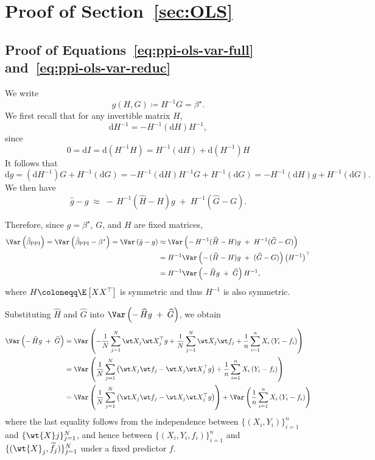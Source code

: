 \section{Proof of Section~\ref{sec:OLS}}
\subsection{Proof of Equations~\eqref{eq:ppi-ols-var-full} and~\eqref{eq:ppi-ols-var-reduc}}
\label{subsec:proof-ols-var}
We write \[g(H,G) \coloneqq H^{-1}G= \beta^\star.\]
We first recall that for any invertible matrix $H$,\[
\mathrm{d}H^{-1}=-H^{-1}(\mathrm{d}H)H^{-1},
\]since\[
0=\mathrm{d}I=\mathrm{d}\left(H^{-1}H\right)=H^{-1}\left(\mathrm{d}H\right)+\mathrm{d}\left(H^{-1}\right)H
\]
It follows that \[\mathrm{d}g=\left(\mathrm{d}H^{-1}\right)G+H^{-1}\left(\mathrm{d}G\right)=-H^{-1}(\mathrm{d}H)H^{-1}G+H^{-1}\left(\mathrm{d}G\right)=-H^{-1}(\mathrm{d}H)g+H^{-1}\left(\mathrm{d}G\right).\]
We then have \[
\widehat{g} - g
\;\approx\;
-\,H^{-1}(\widehat{H} - H)g
\;+\;
H^{-1}(\widehat{G} - G).
\]

\noindent Therefore, since $g=\beta^\star$, $G$, and $H$ are fixed matrices, \begin{align*}
    \Var\left(\hat{\beta}_{\mathrm{PPI}}\right)
    =\Var\left(\hat{\beta}_{\mathrm{PPI}}-\beta^\star\right)
    =\Var\left(\hat{g}-g\right)
    &\approx\Var\left(-\,H^{-1}(\widehat{H} - H)g\;+\;H^{-1}(\widehat{G} - G)\right)\\
    &=H^{-1}\Var\left(-\,(\widehat{H} - H)g\;+\;(\widehat{G} - G)\right)\left(H^{-1}\right)^\top\\
    &=H^{-1}\Var\left(-\,\widehat{H}g\;+\;\widehat{G}\right)H^{-1},
\end{align*}where $H\coloneqq \E\left[XX^\top\right]$ is symmetric and thus $H^{-1}$ is also symmetric.

Substituting $\hat{H}$ and $\hat{G}$ into $\Var\left(-\,\widehat{H}g\;+\;\widehat{G}\right)$, we obtain 
\begin{align*}
    \Var\left(-\,\widehat{H}g\;+\;\widehat{G}\right)&
    =\Var\left(-\frac{1}{N}\sum^N_{j=1}\wt  X_j \wt X_j^\top g
    +\frac{1}{N}\sum^N_{j=1}\wt X_j\wt f_j+\frac{1}{n}\sum^n_{i=1}X_i\left(Y_i-f_i\right)
    \right)\\
    &=\Var\left(\frac{1}{N}\sum^N_{j=1}\left(\wt X_j\wt f_j-\wt X_j\wt X_j^\top g\right)+
    \frac{1}{n}\sum^n_{i=1}X_i\left(Y_i-f_i\right)
    \right)\\
    &=\Var\left(\frac{1}{N}\sum^N_{j=1}\left(\wt X_j\wt f_j-\wt X_j\wt X_j^\top g\right)\right)+
    \Var\left(\frac{1}{n}\sum^n_{i=1}X_i\left(Y_i-f_i\right)
    \right)
\end{align*}where the last equality follows from the independence between $\{(X_i, Y_i)\}_{i=1}^n$ and $\{\wt{X}j\}_{j=1}^N$, and hence between $\{(X_i, Y_i, f_i)\}_{i=1}^n$ and $\{(\wt{X}_j, \widetilde{f}_j)\}_{j=1}^N$ under a fixed predictor $f$.

